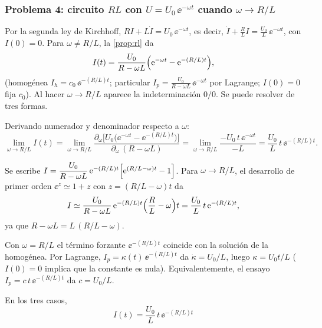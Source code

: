 \subsubsection*{Problema 4: circuito $RL$ con $U=U_0\,\ee^{-\omega t}$ cuando $\omega\to R/L$}

\begin{solucion}
Por la segunda ley de Kirchhoff, $RI+L\dot I=U_0\,\ee^{-\omega t}$, es decir, $\dot I+\frac RL I=\frac{U_0}{L}\,\ee^{-\omega t}$, con $I(0)=0$. Para $\omega\neq R/L$, la \cref{prop:rl} da
\[
  I(t)=\frac{U_0}{R-\omega L}\Bigl(\mathrm{e}^{-\omega t}-\mathrm{e}^{-(R/L)t}\Bigr),
\]
(homogénea $I_h=c_0\,\ee^{-(R/L)t}$; particular $I_p=\frac{U_0}{R-\omega L}\,\ee^{-\omega t}$ por Lagrange; $I(0)=0$ fija $c_0$). Al hacer $\omega\to R/L$ aparece la indeterminación $0/0$. Se puede resolver de tres formas.

Derivando numerador y denominador respecto a $\omega$:
\[
  \lim_{\omega\to R/L}I(t)=\lim_{\omega\to R/L}\frac{\partial_\omega\bigl[U_0\bigl(\ee^{-\omega t}-\ee^{-(R/L)t}\bigr)\bigr]}{\partial_\omega\,(R-\omega L)}
  =\lim_{\omega\to R/L}\frac{-U_0\,t\,\ee^{-\omega t}}{-L}
  =\frac{U_0}{L}\,t\,\ee^{-(R/L)t}.
\]

Se escribe $I=\dfrac{U_0}{R-\omega L}\,\mathrm{e}^{-(R/L)t}\Bigl[\mathrm{e}^{(R/L-\omega)t}-1\Bigr]$. Para $\omega\to R/L$, el desarrollo de primer orden $\ee^{z}\simeq1+z$ con $z=(R/L-\omega)t$ da
\[
  I\simeq\frac{U_0}{R-\omega L}\,\mathrm{e}^{-(R/L)t}\Bigl(\frac RL-\omega\Bigr)t
  =\frac{U_0}{L}\,t\,\mathrm{e}^{-(R/L)t},
\]
ya que $R-\omega L=L\,(R/L-\omega)$.

Con $\omega=R/L$ el término forzante $\ee^{-(R/L)t}$ coincide con la solución de la homogénea. Por Lagrange, $I_p=\kappa(t)\,\ee^{-(R/L)t}$ da $\dot\kappa=U_0/L$, luego $\kappa=U_0t/L$ ($I(0)=0$ implica que la constante es nula). Equivalentemente, el ensayo $I_p=c\,t\,\ee^{-(R/L)t}$ da $c=U_0/L$.

En los tres casos,
\begin{equation}
  \boxed{\,I(t)=\frac{U_0}{L}\,t\,\ee^{-(R/L)t}\,}
  \label{eq:p4}
\end{equation}
\end{solucion}

